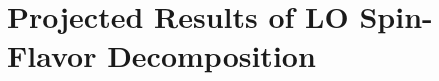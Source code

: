 \documentclass[11pt]{report}
\begin{document}
\chapter{Projected Results of LO Spin-Flavor Decomposition}
 

%
%
%
\clearpage
{}
{}

%
%
%


{}


\end{document}

